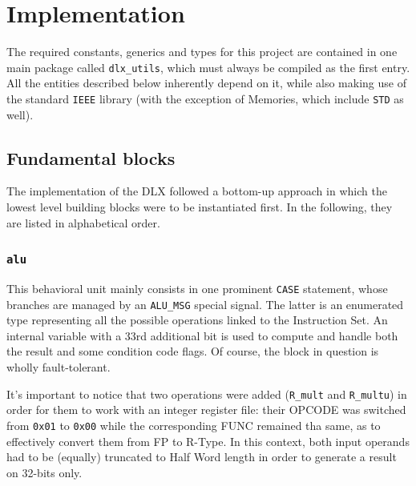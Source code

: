 \chapter{Implementation}
\label{details}
The required constants, generics and types for this project are contained in one main package called \texttt{dlx\_utils}, which must always be compiled as the first entry. All the entities described below inherently depend on it, while also making use of the standard \texttt{IEEE} library (with the exception of Memories, which include \texttt{STD} as well).

\section{Fundamental blocks}
The implementation of the DLX followed a bottom-up approach in which the lowest level building blocks were to be instantiated first. In the following, they are listed in alphabetical order.

\subsection{\texttt{alu}}
This behavioral unit mainly consists in one prominent \texttt{CASE} statement, whose branches are managed by an \texttt{ALU\_MSG} special signal. The latter is an enumerated type representing all the possible operations linked to the Instruction Set. An internal variable with a 33rd additional bit is used to compute and handle both the result and some condition code flags. Of course, the block in question is wholly fault-tolerant.

It's important to notice that two operations were added (\texttt{R\_mult} and \texttt{R\_multu}) in order for them to work with an integer register file: their OPCODE was switched from \texttt{0x01} to \texttt{0x00} while the corresponding FUNC remained tha same, as to effectively convert them from FP to R-Type. In this context, both input operands had to be (equally) truncated to Half Word length in order to generate a result on 32-bits only.

